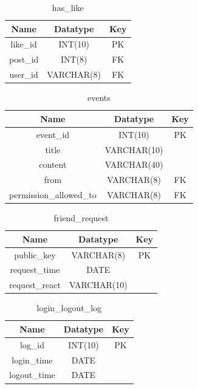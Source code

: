 \begin{table}[!ht]
\caption{has\_like}
\centering
\begin{tabular}{c c c}
\hline\hline
Name               & Datatype    & Key \\
\hline
like\_id           & INT(10)     & PK  \\
post\_id           & INT(8)      & FK  \\
user\_id           & VARCHAR(8)  & FK  \\
\hline
\end{tabular}
\label{table:nonlin}
\end{table}

\begin{table}[!ht]
\caption{events}
\centering
\begin{tabular}{c c c}
\hline\hline
Name                    & Datatype    & Key \\
\hline
event\_id               & INT(10)     & PK  \\
title                   & VARCHAR(10) &     \\
content                 & VARCHAR(40) &     \\
from                    & VARCHAR(8)  & FK  \\
permission\_allowed\_to & VARCHAR(8)  & FK  \\
\hline
\end{tabular}
\label{table:nonlin}
\end{table}

\begin{table}[!ht]
\caption{friend\_request}
\centering
\begin{tabular}{c c c}
\hline\hline
Name               & Datatype    & Key \\
\hline
public\_key        & VARCHAR(8)  & PK  \\
request\_time      & DATE        &     \\
request\_react     & VARCHAR(10) &     \\ %
\hline
\end{tabular}
\label{table:nonlin}
\end{table}

\begin{table}[!ht]
\caption{login\_logout\_log}
\centering
\begin{tabular}{c c c}
\hline\hline
Name               & Datatype    & Key \\
\hline
log\_id            & INT(10)     & PK  \\
login\_time        & DATE        &     \\
logout\_time       & DATE        &     \\
\hline
\end{tabular}
\label{table:nonlin}
\end{table}

